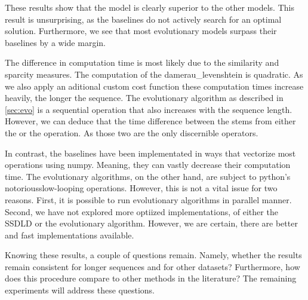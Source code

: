 \documentclass[./../../paper.tex]{subfiles}
\begin{document}
These results show that the model  is clearly superior to the other models. This result is unsurprising, as the baselines do not actively search for an optimal solution. Furthermore, we see that most evolutionary models surpass their baselines by a wide margin. 

The difference in computation time is most likely due to the similarity and sparcity measures. The computation of the \gls{damerau_levenshtein} is quadratic. As we also apply an aditional custom cost function these computation times increase heavily, the longer the sequence. The evolutionary algorithm as described in \autoref{sec:evo} is a sequential operation that also increases with the sequence length. However, we can deduce that the time difference between the  stems from either the  or the  operation. As those two are the only discernible operators. 

In contrast, the baselines have been implementated in ways that vectorize most operations using numpy. Meaning, they can vastly decrease their computation time. The evolutionary algorithms, on the other hand, are subject to python's notorious\needscite slow-looping operations. However, this is not a vital issue for two reasons. First, it is possible to run evolutionary algorithms in parallel manner\needscite. Second, we have not explored more optiized implementations, of either the \gls{SSDLD} or the evolutionary algorithm. However, we are certain, there are better and fast implementations available. 

Knowing these results, a couple of questions remain. Namely, whether the results remain consistent for longer sequences and for other datasets? Furthermore, how does this procedure compare to other methods in the literature? The remaining experiments will address these questions. 
\end{document}
